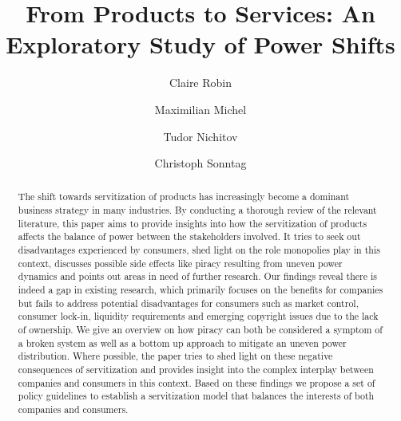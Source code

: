 \documentclass[sigplan,screen,nonacm]{acmart}
\begin{document}
\title{From Products to Services: An Exploratory Study of Power Shifts}

\author{Claire Robin}

\author{Maximilian Michel}

\author{Tudor Nichitov}

\author{Christoph Sonntag}



\begin{abstract}
  The shift towards servitization of products has increasingly become a dominant business strategy in many industries. 
By conducting a thorough review of the relevant literature, this paper aims to provide insights into how the servitization of products affects the balance of power between the stakeholders involved. It tries to seek out disadvantages experienced by consumers, shed light on the role monopolies play in this context, discusses possible side effects like piracy resulting from uneven power dynamics and points out areas in need of further research.
Our findings reveal there is indeed a gap in existing research, which primarily focuses on the benefits for companies but fails to address potential disadvantages for consumers such as market control, consumer lock-in, liquidity requirements and emerging copyright issues due to the lack of ownership. We give an overview on how piracy can both be considered a symptom of a broken system as well as a bottom up approach to mitigate an uneven power distribution. Where possible, the paper tries to shed light on these negative consequences of servitization and provides insight into the complex interplay between companies and consumers in this context. Based on these findings we propose a set of policy guidelines to establish a servitization model that balances the interests of both companies and consumers.
\end{abstract}
\end{document}
